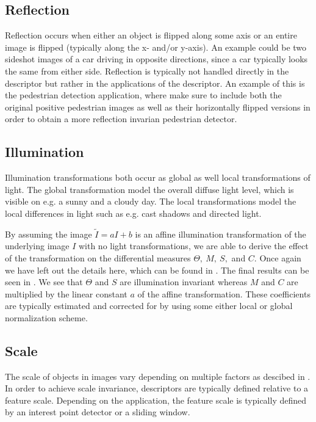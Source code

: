 \documentclass[thesis.tex]{subfiles}
\begin{document}
\subsection{Reflection}
Reflection occurs when either an object is flipped along some axis or an entire image is flipped (typically along the x- and/or y-axis). An example could be two sideshot images of a car driving in opposite directions, since a car typically looks the same from either side. Reflection is typically not handled directly in the descriptor but rather in the applications of the descriptor. An example of this is the pedestrian detection application, where \cite{dalal2005histograms} make sure to include both the original positive pedestrian images as well as their horizontally flipped versions in order to obtain a more reflection invarian pedestrian detector.

\subsection{Illumination}
\label{sec:illumination}
Illumination transformations both occur as global as well local transformations of light. The global transformation model the overall diffuse light level, which is visible on e.g. a sunny and a cloudy day. The local transformations model the local differences in light such as e.g. cast shadows and directed light.

By assuming the image $\tilde{I} = a I +  b$ is an affine illumination transformation of the underlying image $I$ with no light transformations, we are able to derive the effect of the transformation on the differential measures $\Theta,~M,~S,$ and $C$. Once again we have left out the details here, which can be found in . The final results can be seen in . We see that $\Theta$ and $S$ are illumination invariant whereas $M$ and $C$ are multiplied by the linear constant $a$ of the affine transformation. These coefficients are typically estimated and corrected for by using some either local or global normalization scheme.

\subsection{Scale}
\label{sec:scaleInvariance}

The scale of objects in images vary depending on multiple factors as descibed in . In order to achieve scale invariance, descriptors are typically defined relative to a feature scale. Depending on the application, the feature scale is typically defined by an interest point detector or a sliding window.
\end{document}
